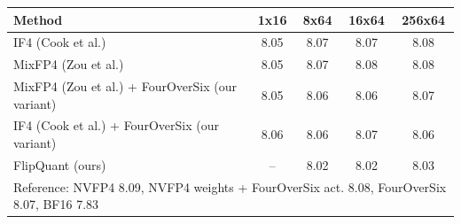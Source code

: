 \begin{tabular}{lcccc}
\toprule
Method & 1x16 & 8x64 & 16x64 & 256x64 \\
\midrule
IF4 (Cook et al.) & 8.05 & 8.07 & 8.07 & 8.08 \\
MixFP4 (Zou et al.) & 8.05 & 8.07 & 8.08 & 8.08 \\
MixFP4 (Zou et al.) + FourOverSix (our variant) & 8.05 & 8.06 & 8.06 & 8.07 \\
IF4 (Cook et al.) + FourOverSix (our variant) & 8.06 & 8.06 & 8.07 & 8.06 \\
FlipQuant (ours) & -- & 8.02 & 8.02 & 8.03 \\
\midrule
\multicolumn{5}{l}{\footnotesize Reference: NVFP4 8.09, NVFP4 weights + FourOverSix act. 8.08, FourOverSix 8.07, BF16 7.83} \\
\bottomrule
\end{tabular}
